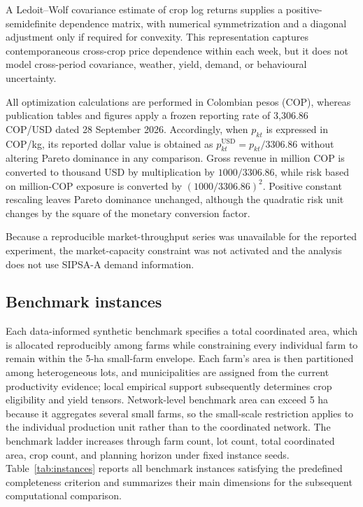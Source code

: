 \documentclass[]{interact}
\begin{document}


A Ledoit--Wolf covariance estimate of crop log returns supplies a positive-semidefinite dependence matrix, with numerical symmetrization and a diagonal adjustment only if required for convexity. This representation captures contemporaneous cross-crop price dependence within each week, but it does not model cross-period covariance, weather, yield, demand, or behavioural uncertainty.

All optimization calculations are performed in Colombian pesos (COP), whereas publication tables and figures apply a frozen reporting rate of 3,306.86 COP/USD dated 28 September 2026. Accordingly, when $p_{kt}$ is expressed in COP/kg, its reported dollar value is obtained as $p^{\mathrm{USD}}_{kt}=p_{kt}/3306.86$ without altering Pareto dominance in any comparison. Gross revenue in million COP is converted to thousand USD by multiplication by $1000/3306.86$, while risk based on million-COP exposure is converted by $(1000/3306.86)^2$. Positive constant rescaling leaves Pareto dominance unchanged, although the quadratic risk unit changes by the square of the monetary conversion factor.

Because a reproducible market-throughput series was unavailable for the reported experiment, the market-capacity constraint was not activated and the analysis does not use SIPSA-A demand information.

\subsection{Benchmark instances}

Each data-informed synthetic benchmark specifies a total coordinated area, which is allocated reproducibly among farms while constraining every individual farm to remain within the 5-ha small-farm envelope. Each farm's area is then partitioned among heterogeneous lots, and municipalities are assigned from the current productivity evidence; local empirical support subsequently determines crop eligibility and yield tensors. Network-level benchmark area can exceed 5 ha because it aggregates several small farms, so the small-scale restriction applies to the individual production unit rather than to the coordinated network. The benchmark ladder increases through farm count, lot count, total coordinated area, crop count, and planning horizon under fixed instance seeds. Table~\ref{tab:instances} reports all benchmark instances satisfying the predefined completeness criterion and summarizes their main dimensions for the subsequent computational comparison.
\end{document}
